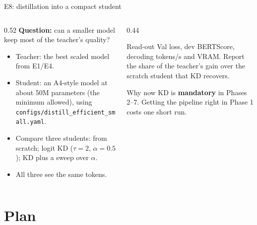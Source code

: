 \documentclass[aspectratio=169,11pt]{beamer}
\newcommand{\code}[1]{\texttt{\small #1}}
\begin{document}
\begin{frame}{E8: distillation into a compact student}
  \begin{columns}[T]
    \begin{column}{0.52\textwidth}
      \small
      \textbf{Question:} can a smaller model keep most of the teacher's quality?
      \begin{itemize}
        \item Teacher: the best scaled model from E1/E4.
        \item Student: an A4-style model at about 50M parameters (the minimum allowed), using \code{configs/distill\_efficient\_small.yaml}.
        \item Compare three students: from scratch; logit KD ($\tau{=}2$, $\alpha{=}0.5$); KD plus a sweep over $\alpha$.
        \item All three see the same tokens.
      \end{itemize}
    \end{column}
    \begin{column}{0.44\textwidth}
      \begin{block}{Read-out}
        \small Val loss, dev BERTScore, decoding tokens/s and VRAM. Report the share of the teacher's gain over the scratch student that KD recovers.
      \end{block}
      \begin{exampleblock}{Why now}
        \small KD is \textbf{mandatory} in Phases 2--7. Getting the pipeline right in Phase 1 costs one short run.
      \end{exampleblock}
    \end{column}
  \end{columns}
\end{frame}

\section{Plan}
\end{document}
